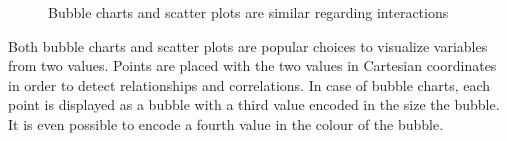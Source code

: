 \begin{figure}
  \centering
    \qquad
    \caption{Bubble charts and scatter plots are similar regarding interactions}%
    \label{fig:analysis:bubble-chart}
\end{figure}

Both bubble charts and scatter plots are popular choices to visualize variables from two values.
Points are placed with the two values in Cartesian coordinates in order to detect relationships and correlations.
In case of bubble charts, each point is displayed as a bubble with a third value encoded in the size the bubble.
It is even possible to encode a fourth value in the colour of the bubble.

